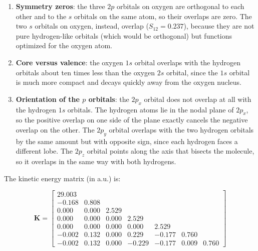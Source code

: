 \documentclass[
  english,
  9pt,
]{extbook}
\providecommand{\tightlist}{%
  \setlength{\itemsep}{0pt}\setlength{\parskip}{0pt}}
\theoremstyle{definition}
\theoremstyle{definition}
\theoremstyle{definition}
\theoremstyle{definition}
\theoremstyle{remark}
\begin{document}
\begin{enumerate}
\def\labelenumi{\arabic{enumi}.}
\tightlist
\item
  \textbf{Symmetry zeros}: the three \(2p\) orbitals on oxygen are orthogonal to each other and to the \(s\) orbitals on the same atom, so their overlaps are zero. The two \(s\) orbitals on oxygen, instead, overlap (\(S_{12} = 0.237\)), because they are not pure hydrogen-like orbitals (which would be orthogonal) but functions optimized for the oxygen atom.
\item
  \textbf{Core versus valence}: the oxygen \(1s\) orbital overlaps with the hydrogen orbitals about ten times less than the oxygen \(2s\) orbital, since the \(1s\) orbital is much more compact and decays quickly away from the oxygen nucleus.
\item
  \textbf{Orientation of the \(p\) orbitals}: the \(2p_x\) orbital does not overlap at all with the hydrogen \(1s\) orbitals. The hydrogen atoms lie in the nodal plane of \(2p_x\), so the positive overlap on one side of the plane exactly cancels the negative overlap on the other. The \(2p_y\) orbital overlaps with the two hydrogen orbitals by the same amount but with opposite sign, since each hydrogen faces a different lobe. The \(2p_z\) orbital points along the axis that bisects the molecule, so it overlaps in the same way with both hydrogens.
\end{enumerate}

The kinetic energy matrix (in a.u.) is:

\begin{equation}
\mathbf{K}=
\begin{bmatrix}
29.003 & & & & & & \\
-0.168 & 0.808 & & & & &  \\
0.000 & 0.000 & 2.529 & & & & \\
0.000 & 0.000 & 0.000 & 2.529 & & & \\
0.000 & 0.000 & 0.000 & 0.000 & 2.529 & & \\
-0.002 & 0.132 & 0.000 & 0.229 & -0.177 & 0.760 & \\
-0.002 & 0.132 & 0.000 & -0.229 & -0.177 & 0.009 & 0.760
\end{bmatrix}
\label{eq:kmatrix}
\end{equation}
\end{document}
